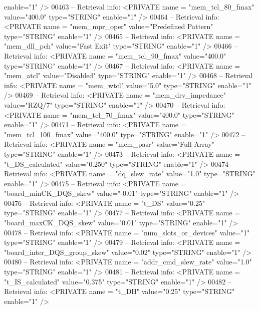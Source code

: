 \begin{DoxyCode}
{{       enable="1" />}
00463 \textcolor{keyword}{-- Retrieval info:      <PRIVATE name = "mem\_tcl\_80\_fmax" value="400.0"  type="STRING"  enable="1" />}
00464 \textcolor{keyword}{-- Retrieval info:      <PRIVATE name = "mem\_mpr\_oper" value="Predefined Pattern"  type="STRING" 
       enable="1" />}
00465 \textcolor{keyword}{-- Retrieval info:      <PRIVATE name = "mem\_dll\_pch" value="Fast Exit"  type="STRING"  enable="1" />}
00466 \textcolor{keyword}{-- Retrieval info:      <PRIVATE name = "mem\_tcl\_90\_fmax" value="400.0"  type="STRING"  enable="1" />}
00467 \textcolor{keyword}{-- Retrieval info:      <PRIVATE name = "mem\_atcl" value="Disabled"  type="STRING"  enable="1" />}
00468 \textcolor{keyword}{-- Retrieval info:      <PRIVATE name = "mem\_wtcl" value="5.0"  type="STRING"  enable="1" />}
00469 \textcolor{keyword}{-- Retrieval info:      <PRIVATE name = "mem\_drv\_impedance" value="RZQ/7"  type="STRING"  enable="1" />}
00470 \textcolor{keyword}{-- Retrieval info:      <PRIVATE name = "mem\_tcl\_70\_fmax" value="400.0"  type="STRING"  enable="1" />}
00471 \textcolor{keyword}{-- Retrieval info:      <PRIVATE name = "mem\_tcl\_100\_fmax" value="400.0"  type="STRING"  enable="1" />}
00472 \textcolor{keyword}{-- Retrieval info:      <PRIVATE name = "mem\_pasr" value="Full Array"  type="STRING"  enable="1" />}
00473 \textcolor{keyword}{-- Retrieval info:      <PRIVATE name = "t\_DS\_calculated" value="0.250"  type="STRING"  enable="1" />}
00474 \textcolor{keyword}{-- Retrieval info:      <PRIVATE name = "dq\_slew\_rate" value="1.0"  type="STRING"  enable="1" />}
00475 \textcolor{keyword}{-- Retrieval info:      <PRIVATE name = "board\_minCK\_DQS\_skew" value="-0.01"  type="STRING"  enable="1" />}
00476 \textcolor{keyword}{-- Retrieval info:      <PRIVATE name = "t\_DS" value="0.25"  type="STRING"  enable="1" />}
00477 \textcolor{keyword}{-- Retrieval info:      <PRIVATE name = "board\_maxCK\_DQS\_skew" value="0.01"  type="STRING"  enable="1" />}
00478 \textcolor{keyword}{-- Retrieval info:      <PRIVATE name = "num\_slots\_or\_devices" value="1"  type="STRING"  enable="1" />}
00479 \textcolor{keyword}{-- Retrieval info:      <PRIVATE name = "board\_inter\_DQS\_group\_skew" value="0.02"  type="STRING" 
       enable="1" />}
00480 \textcolor{keyword}{-- Retrieval info:      <PRIVATE name = "addr\_cmd\_slew\_rate" value="1.0"  type="STRING"  enable="1" />}
00481 \textcolor{keyword}{-- Retrieval info:      <PRIVATE name = "t\_IS\_calculated" value="0.375"  type="STRING"  enable="1" />}
00482 \textcolor{keyword}{-- Retrieval info:      <PRIVATE name = "t\_DH" value="0.25"  type="STRING"  enable="1" />}
}
\end{DoxyCode}

